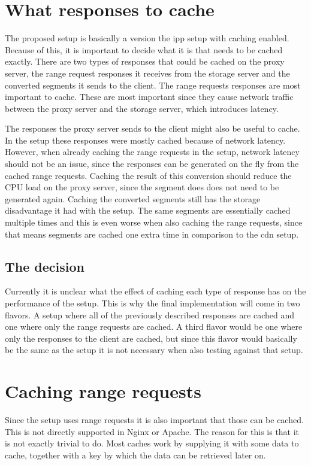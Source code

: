 \documentclass[twoside,openright]{uva-bachelor-thesis}
\begin{document}
\section{What responses to cache}
The proposed setup is basically a version the \gls{ipp} setup with
caching enabled. Because of this, it is important to decide what it is that
needs to be cached exactly. There are two types of responses that could be
cached on the proxy server, the range request responses it receives from the
storage server and the converted segments it sends to the client. The
range requests responses are most important to cache. These are most important
since they cause network traffic between the proxy server and the storage
server, which introduces latency.

The responses the proxy server sends to the client might also be useful to
cache. In the \cdn setup these responses were mostly cached because of
network latency. However, when already caching the range requests in the
\ipp setup, network latency should not be an issue, since the responses can
be generated on the fly from the cached range requests. Caching the
result of this conversion should reduce the CPU load on the proxy server, since
the segment does does not need to be generated again. Caching the converted
segments still has the storage disadvantage it had with the \cdn setup. The same
segments are essentially cached multiple times and this is even worse when also
caching the range requests, since that means segments are cached one extra time
in comparison to the \gls{cdn} setup.


\subsection{The decision}
Currently it is unclear what the effect of caching each type of response has on
the performance of the setup. This is why the final implementation will come in
two flavors. A setup where all of the previously described responses are cached
and one where only the range requests are cached. A third flavor would be one
where only the responses to the client are cached, but since this flavor would
basically be the same as the \cdn setup it is not necessary when also testing
against that setup.




\section{Caching range requests}\label{sec:cachingrange}
Since the \ipp setup uses range requests it is also important that those
can be cached. This is not directly supported in Nginx or Apache. The reason for
this is that it is not exactly trivial to do. Most caches work by supplying it
with some data to cache, together with a key by which the data can be retrieved later
on.
\end{document}
